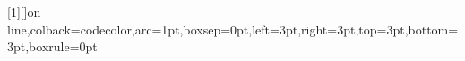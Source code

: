 \pagestyle{simple}



\renewcommand{\cftchapterdotsep}{5}

\renewcommand{\cftchapterfont}{}
\renewcommand{\cftchapterpagefont}{}

\usepackage{framed}
\usepackage{mdframed}

\setlength{\FrameSep}{0em}
\setlength{\fboxrule}{2.5pt}

\newenvironment{customleftbar}[1][\parindent]
  {\def\FrameCommand{\hspace{#1}\textcolor[rgb]{0.65, 0.65, 0.65}{\vrule width \fboxrule} \hspace{-1.0em}}%
   \MakeFramed {\advance\hsize-\width \FrameRestore}\vspace{0pt}}%
  {\vspace{0pt}\endMakeFramed}

\let\oldquote\quote
\let\endoldquote\endquote
\renewenvironment{quote}
  {\begin{customleftbar}\oldquote\raggedright}
  {\endoldquote\end{customleftbar}}

\newenvironment{Shaded}{%
  \begin{mdframed}[%
    backgroundcolor=shadecolor, innertopmargin=15pt, innerbottommargin=15pt,
    innerleftmargin=20pt, innerrightmargin=20pt, linewidth=0pt, roundcorner=0pt]}%
  {\end{mdframed}}

\usepackage{tcolorbox}
\newtcbox{\codebox}[1][]{on line,colback=codecolor,arc=1pt,boxsep=0pt,left=3pt,right=3pt,top=3pt,bottom=3pt,boxrule=0pt}


